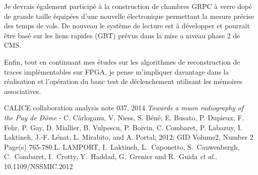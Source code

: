 \documentclass[11pt,french]{article}
\begin{document}
Je devrais \'egalement particip\'e \`a la construction de chambres GRPC \`a verre dop\'e de grande taille \'equip\'ees d'une nouvelle \'electronique permettant la mesure pr\'ecise des temps de vols. De nouveau le syst\`eme de lecture est \`a d\'evelopper et pourrait \^etre bas\'e sur les liens rapides (GBT) pr\'evus dans la mise a niveau phase 2 de CMS.

Enfin, tout en continuant mes \'etudes sur les algorithmes de reconstruction de traces impl\'ementables sur FPGA, je pense m'impliquer davantage dans la r\'ealisation et l'op\'eration du banc test de d\'eclenchement utilisant les m\'emoires associatives. 
                  
\begin{thebibliography}{2}
    CALICE collaboration analysis note 037, 2014 
    {\it Towards a muon radiography of the Puy de Dôme} - C. Cârloganu, V. Niess, S. Béné, E. Busato, P. Dupieux, F. Fehr, P. Gay, D. Miallier, B. Vulpescu, P. Boivin, C. Combaret, P. Labazuy, I. Laktineh, J.-F. Lénat, L. Mirabito, and A. Portal; 2012; GID Volume2, Number 2 Page(s) 765-780.L. LAMPORT, 
  I.~Laktineh, L.~Caponetto, S.~Cauwenbergh, C.~Combaret, I.~Crotty, Y.~Haddad, G.~Grenier and R.~Guida {\it et al.}. 10.1109/NSSMIC.2012

\end{thebibliography}
\end{document}

